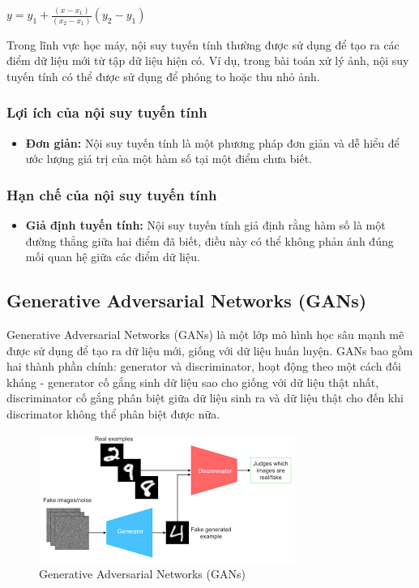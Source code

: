 $y = y_1 + \frac{(x - x_1)}{(x_2 - x_1)}(y_2 - y_1)$

Trong lĩnh vực học máy, nội suy tuyến tính thường được sử dụng để tạo ra các điểm dữ liệu mới từ tập dữ liệu hiện có. Ví dụ, trong bài toán xử lý ảnh, nội suy tuyến tính có thể được sử dụng để phóng to hoặc thu nhỏ ảnh. 

\subsubsection{Lợi ích của nội suy tuyến tính}
\begin{itemize}
    \item \textbf{Đơn giản:} Nội suy tuyến tính là một phương pháp đơn giản và dễ hiểu để ước lượng giá trị của một hàm số tại một điểm chưa biết.
\end{itemize}

\subsubsection{Hạn chế của nội suy tuyến tính}
\begin{itemize}
    \item \textbf{Giả định tuyến tính:} Nội suy tuyến tính giả định rằng hàm số là một đường thẳng giữa hai điểm đã biết, điều này có thể không phản ánh đúng mối quan hệ giữa các điểm dữ liệu.
\end{itemize}

\subsection{Generative Adversarial Networks (GANs)}

Generative Adversarial Networks (GANs) là một lớp mô hình học sâu mạnh mẽ được sử dụng để tạo ra dữ liệu mới, giống với dữ liệu huấn luyện. GANs bao gồm hai thành phần chính: generator và discriminator, hoạt động theo một cách đối kháng - generator cố gắng sinh dữ liệu sao cho giống với dữ liệu thật nhất, discriminator cố gắng phân biệt giữa dữ liệu sinh ra và dữ liệu thật cho đến khi discrimator không thể phân biệt được nữa.

 \begin{figure}[H]
    \centering
    \includegraphics[scale = 0.8]{Images/Theoretical basis/GAN.png}
\caption{Generative Adversarial Networks (GANs)}
\end{figure}

